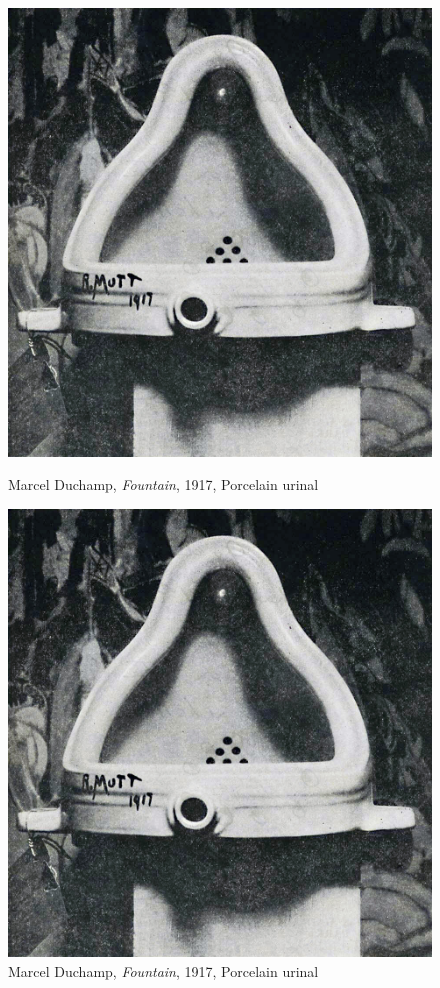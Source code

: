\begin{figure}[!tbp]
  \centering
  \begin{minipage}[b]{0.48\textwidth}
    \includegraphics[width=\textwidth]{graphics/Duchamp_Fountaine.jpg}
    \caption{Marcel Duchamp, \textit{Fountain}, 1917, Porcelain urinal}
    \label{fig:Duchamp_Fountaine2}
  \end{minipage}
  \hfill
  \begin{minipage}[b]{0.48\textwidth}
    \includegraphics[width=\textwidth]{graphics/Duchamp_Fountaine.jpg}
    \caption{Marcel Duchamp, \textit{Fountain}, 1917, Porcelain urinal}
    \label{fig:Duchamp_Fountaine3}
  \end{minipage}
\end{figure}
